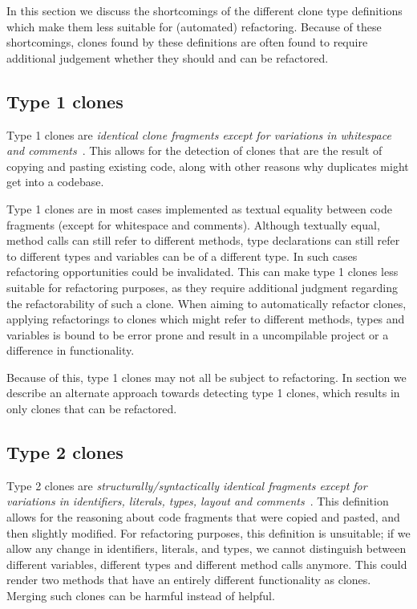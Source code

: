 \documentclass[a4paper]{article}
\begin{document}
In this section we discuss the shortcomings of the different clone type definitions which make them less suitable for (automated) refactoring. Because of these shortcomings, clones found by these definitions are often found to require additional judgement whether they should and can be refactored.

\subsection{Type 1 clones} \label{sec:type1}
Type 1 clones are \textit{identical clone fragments except for variations in whitespace and comments}~\cite{roy2007survey}. This allows for the detection of clones that are the result of copying and pasting existing code, along with other reasons why duplicates might get into a codebase.

Type 1 clones are in most cases implemented as textual equality between code fragments (except for whitespace and comments). Although textually equal, method calls can still refer to different methods, type declarations can still refer to different types and variables can be of a different type. In such cases refactoring opportunities could be invalidated. This can make type 1 clones less suitable for refactoring purposes, as they require additional judgment regarding the refactorability of such a clone. When aiming to automatically refactor clones, applying refactorings to clones which might refer to different methods, types and variables is bound to be error prone and result in a uncompilable project or a difference in functionality.

Because of this, type 1 clones may not all be subject to refactoring. In section \label{chap:type1rclones} we describe an alternate approach towards detecting type 1 clones, which results in only clones that can be refactored.

\subsection{Type 2 clones}\label{sec:type2}
Type 2 clones are \textit{structurally/syntactically identical fragments except for variations in identifiers, literals, types, layout and comments}~\cite{roy2007survey}. This definition allows for the reasoning about code fragments that were copied and pasted, and then slightly modified. For refactoring purposes, this definition is unsuitable; if we allow any change in identifiers, literals, and types, we cannot distinguish between different variables, different types and different method calls anymore. This could render two methods that have an entirely different functionality as clones. Merging such clones can be harmful instead of helpful.
\end{document}

